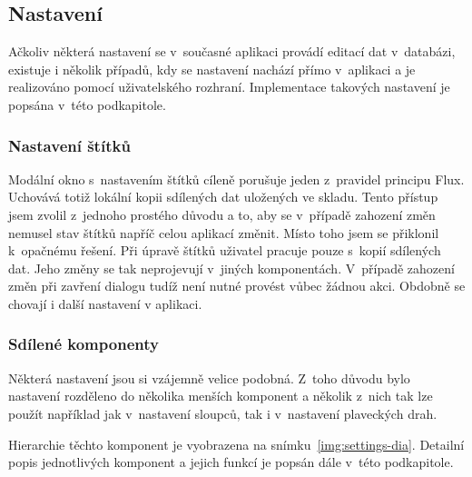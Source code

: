 \subsection{Nastavení}
Ačkoliv některá nastavení se v~současné aplikaci provádí editací dat v~databázi, existuje i několik případů, kdy se nastavení nachází přímo v~aplikaci a je realizováno pomocí uživatelského rozhraní. Implementace takových nastavení je popsána v~této podkapitole.

\subsubsection*{Nastavení štítků}
Modální okno s~nastavením štítků cíleně porušuje jeden z~pravidel principu Flux. Uchovává totiž lokální kopii sdílených dat uložených ve skladu. Tento přístup jsem zvolil z~jednoho prostého důvodu a to, aby se v~případě zahození změn nemusel stav štítků napříč celou aplikací změnit. Místo toho jsem se přiklonil k~opačnému řešení. Při úpravě štítků uživatel pracuje pouze s~kopií sdílených dat. Jeho změny se tak neprojevují v~jiných komponentách. V~případě zahození změn při zavření dialogu tudíž není nutné provést vůbec žádnou akci. Obdobně se chovají i další nastavení v aplikaci.

\subsubsection*{Sdílené komponenty}
Některá nastavení jsou si vzájemně velice podobná. Z~toho důvodu bylo nastavení rozděleno do několika menších komponent a několik z~nich tak lze použít například jak v~nastavení sloupců, tak i v~nastavení plaveckých drah.

Hierarchie těchto komponent je vyobrazena na snímku~\ref{img:settings-dia}. Detailní popis jednotlivých komponent a jejich funkcí je popsán dále v~této podkapitole.


